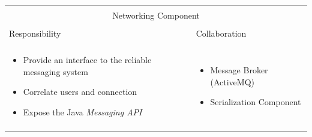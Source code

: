 \noindent
\begin{tabular}{|l|l|}
    \cline{1-2}
    \multicolumn{2}{|c|}{} \\[-0.3cm]
    \multicolumn{2}{|c|}{Networking Component} \\ 
    \multicolumn{2}{|c|}{} \\[-0.3cm]
    \cline{1-2}
    Responsibility & Collaboration \\
    \cline{1-2}
    & \\[-0.2cm]
    \begin{minipage}{0.47\textwidth}
        \begin{itemize}
          \item Provide an interface to the reliable messaging system
          \item Correlate users and connection
          \item Expose the Java \textit{Messaging API}
        \end{itemize} 
    \end{minipage}
	&
    \begin{minipage}{0.47\textwidth}
        \begin{itemize}
          \item Message Broker (ActiveMQ)
          \item Serialization Component
        \end{itemize} 
    \end{minipage}
	\\ & \\
    \hline
\end{tabular}

